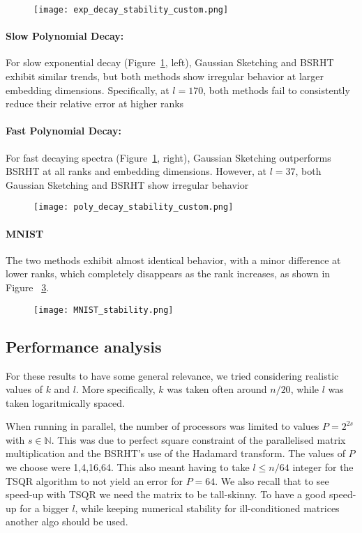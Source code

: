 \documentclass[a4paper, 12pt,oneside]{article}
\begin{document}
\begin{figure}[h]
    \centering
    \texttt{[image: exp\_decay\_stability\_custom.png]}
    \caption{}
    \label{fig:slow_fast_exp_decay}
\end{figure}
\paragraph{Slow Polynomial Decay:} 
For slow exponential decay (Figure~\ref{fig:slow_fast_exp_decay}, left), Gaussian Sketching and BSRHT exhibit similar trends, but both methods show irregular behavior at larger embedding dimensions. 
Specifically, at $l=170$, both methods fail to consistently reduce their relative error at higher ranks

\paragraph{Fast Polynomial Decay:} 
For fast decaying spectra (Figure~\ref{fig:slow_fast_exp_decay}, right), Gaussian Sketching outperforms BSRHT at all ranks and embedding dimensions.
 However, at $l=37$, both Gaussian Sketching and BSRHT show irregular behavior
\begin{figure}[h]
    \centering
    \texttt{[image: poly\_decay\_stability\_custom.png]}
    \caption{}
    \label{fig:poly_decay}
\end{figure}
\paragraph{MNIST}
The two methods exhibit almost identical behavior, with a minor difference at lower ranks, which completely disappears as the rank increases, as shown in Figure ~\ref{fig:mnsit_decay}.
 \begin{figure}[h]
    \centering
    \texttt{[image: MNIST\_stability.png]}
    \caption{}
    \label{fig:mnsit_decay}
\end{figure}
	\subsection{Performance analysis}
		For these results to have some general relevance, we tried considering realistic values of $k$ and $l$. More specifically, $k$ was taken often around $n/20$, while $l$ was taken logaritmically spaced.
	
		When running in parallel, the number of processors was limited to values $P=2^{2s}$ with $s\in\mathbb{N}$. This was due to perfect square constraint of the parallelised matrix multiplication and the BSRHT's use of the Hadamard transform. The values of $P$ we choose were 1,4,16,64. 		
		This also meant having to take $l\le n/64$ integer for the TSQR algorithm to not yield an error for $P=64$. We also recall that to see speed-up with TSQR we need the matrix to be tall-skinny. To have a good speed-up for a bigger $l$, while keeping numerical stability for ill-conditioned matrices another algo should be used.	
\end{document}
